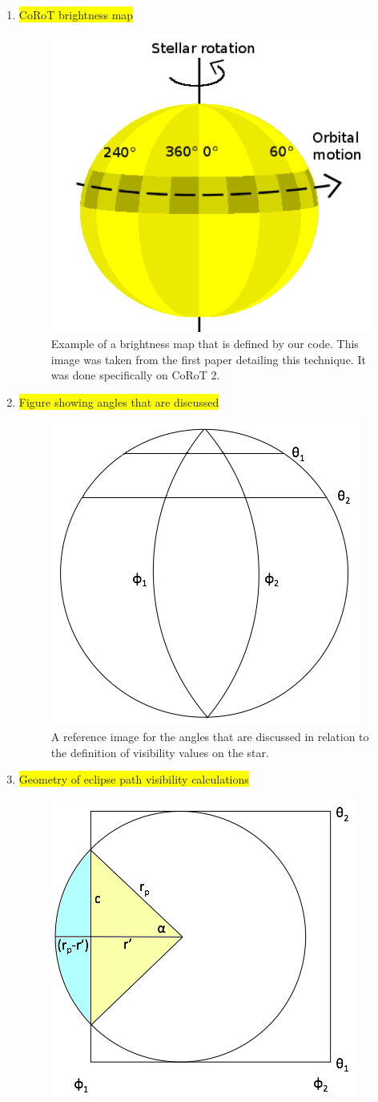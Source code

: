 \documentclass[iop]{emulateapj}
\newcommand{\hilight}[1]{\colorbox{yellow}{#1}}
\begin{document}
\begin{enumerate}
		\item  \hilight{CoRoT brightness map}
			\begin{figure}[h]
				\centering
				\includegraphics[width=.5\textwidth]{images/modelGeometry.png}
				\caption{Example of a brightness map that is defined by our code. This image was taken from the first paper detailing this technique. It was done specifically on CoRoT 2.}
				\label{CoRoT}
			\end{figure}
		\item  \hilight{Figure showing angles that are discussed}
			\begin{figure}[h]
				\centering
				\includegraphics[width=.5\textwidth]{images/angles.png}
				\caption{A reference image for the angles that are discussed in relation to the definition of visibility values on the star.}
				\label{angles}
			\end{figure}
		\item  \hilight{Geometry of eclipse path visibility calculations}
			\begin{figure}[h]
				\centering
				\includegraphics[width=.5\textwidth]{images/figure.png}

\end{figure}
\end{enumerate}
\end{document}
